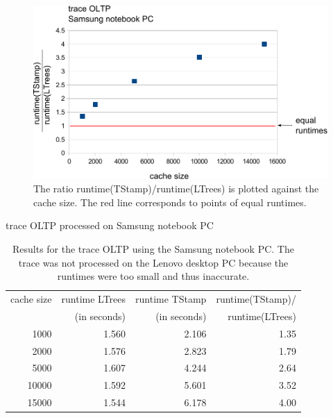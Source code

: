 \documentclass[a4paper,12pt, titlepage]{article}  %
\begin{document}
\begin{figure}[p]
	\centering
	\includegraphics[scale=0.8]{./experiments/samsung_OLTP.pdf}
	\caption{The ratio runtime(TStamp)/runtime(LTrees) is plotted against the cache size.
                     The red line corresponds to points of equal runtimes.} 
	\label{fig:samsung_OLTP}
\end{figure}


\begin{table}[p]
\begin{center}
	trace OLTP processed on Samsung notebook PC
	\begin{tabular}{|r||r|r|r|}
	  	\hline
                cache size                               &     runtime LTrees         &      runtime TStamp          &  runtime(TStamp)/ \\
                                                             &      (in seconds)            &      (in seconds)                 & runtime(LTrees)     \\
                \hline
                1000			                     &         1.560                     &          2.106                          &      1.35            \\
		2000					     &         1.576                     &          2.823                          &      1.79            \\								
		5000					     &         1.607                     &          4.244                          &      2.64            \\	
		10000		         	     &         1.592                     &          5.601                          &      3.52            \\	
		15000				     &         1.544                     &          6.178                          &      4.00             \\	
		\hline
	\end{tabular}
	\caption{Results for the trace OLTP using the Samsung notebook PC. The trace was not processed on the Lenovo
                     desktop PC because the runtimes were too small and thus inaccurate.}
        \label{tab:samsung_OLTP}
\end{center}
\end{table}
\end{document}

